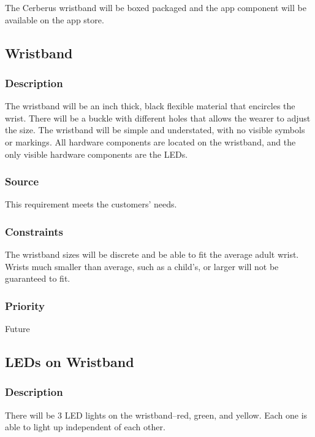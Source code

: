 The Cerberus wristband will be boxed packaged and the app component will be available on the app store.

\subsection{Wristband}
\subsubsection{Description}
The wristband will be an inch thick, black flexible material that encircles the wrist. There will be a buckle with different holes that allows the wearer to adjust the size. The wristband will be simple and understated, with no visible symbols or markings. All hardware components are located on the wristband, and the only visible hardware components are the LEDs.
\subsubsection{Source}
This requirement meets the customers' needs.
\subsubsection{Constraints}
The wristband sizes will be discrete and be able to fit the average adult wrist. Wrists much smaller than average, such as a child's, or larger will not be guaranteed to fit.
\subsubsection{Priority}
Future

\subsection{LEDs on Wristband}
\subsubsection{Description}
There will be 3 LED lights on the wristband--red, green, and yellow. Each one is able to light up independent of each other.
